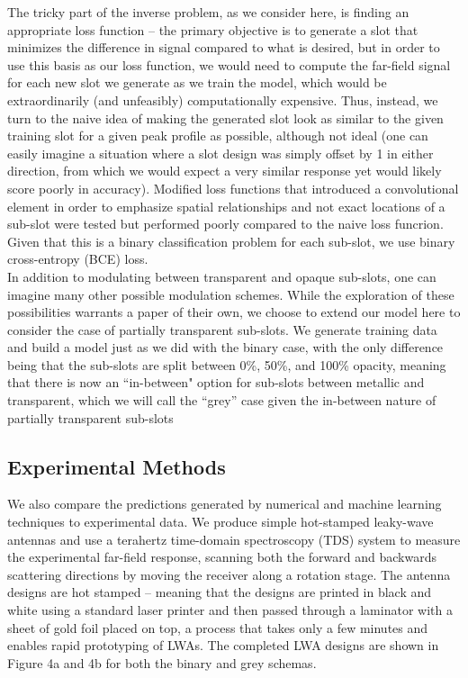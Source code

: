 \documentclass[11pt]{article}
\begin{document}
\noindent The tricky part of the inverse problem, as we consider here, is finding an appropriate loss function -- the primary objective is to generate a slot that minimizes the difference in signal compared to what is desired, but in order to use this basis as our loss function, we would need to compute the far-field signal for each new slot we generate as we train the model, which would be extraordinarily (and unfeasibly) computationally expensive. Thus, instead, we turn to the naive idea of making the generated slot look as similar to the given training slot for a given peak profile as possible, although not ideal (one can easily imagine a situation where a slot design was simply offset by 1 in either direction, from which we would expect a very similar response yet would likely score poorly in accuracy). Modified loss functions that introduced a convolutional element in order to emphasize spatial relationships and not exact locations of a sub-slot were tested but performed poorly compared to the naive loss funcrion. Given that this is a binary classification problem for each sub-slot, we use binary cross-entropy (BCE) loss. \\

\noindent In addition to modulating between transparent and opaque sub-slots, one can imagine many other possible modulation schemes. While the exploration of these possibilities warrants a paper of their own, we choose to extend our model here to consider the case of partially transparent sub-slots. We generate training data and build a model just as we did with the binary case, with the only difference being that the sub-slots are split between 0\%, 50\%, and 100\% opacity, meaning that there is now an ``in-between" option for sub-slots between metallic and transparent, which we will call the ``grey'' case given the in-between nature of partially transparent sub-slots \\

\subsection*{Experimental Methods}

\noindent We also compare the predictions generated by numerical and machine learning techniques to experimental data. We produce simple hot-stamped leaky-wave antennas \cite{Guerboukha:21} and use a terahertz time-domain spectroscopy (TDS) system to measure the experimental far-field response, scanning both the forward and backwards scattering directions by moving the receiver along a rotation stage. The antenna designs are hot stamped -- meaning that the designs are printed in black and white using a standard laser printer and then passed through a laminator with a sheet of gold foil placed on top, a process that takes only a few minutes and enables rapid prototyping of LWAs. The completed LWA designs are shown in Figure 4a and 4b for both the binary and grey schemas. 
\end{document}
